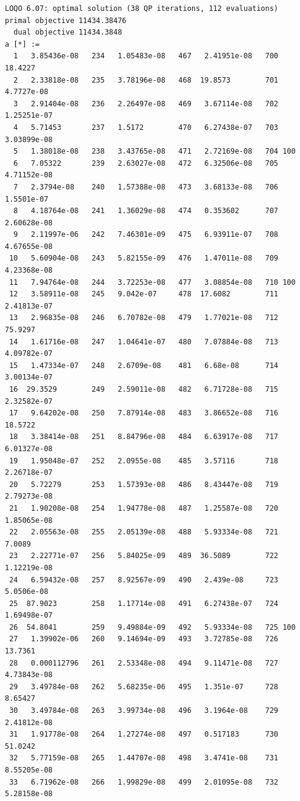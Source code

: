 \documentclass{article}
\begin{document}
\begin{verbatim}
LOQO 6.07: optimal solution (38 QP iterations, 112 evaluations)
primal objective 11434.38476
  dual objective 11434.3848
a [*] :=
  1   3.85436e-08   234   1.05483e-08   467   2.41951e-08   700  18.4227
  2   2.33818e-08   235   3.78196e-08   468  19.8573        701   4.7727e-08
  3   2.91404e-08   236   2.26497e-08   469   3.67114e-08   702   1.25251e-07
  4   5.71453       237   1.5172        470   6.27438e-07   703   3.03899e-08
  5   1.38018e-08   238   3.43765e-08   471   2.72169e-08   704 100
  6   7.05322       239   2.63027e-08   472   6.32506e-08   705   4.71152e-08
  7   2.3794e-08    240   1.57388e-08   473   3.68133e-08   706   1.5501e-07
  8   4.18764e-08   241   1.36029e-08   474   0.353602      707   2.60628e-08
  9   2.11997e-06   242   7.46301e-09   475   6.93911e-07   708   4.67655e-08
 10   5.60904e-08   243   5.82155e-09   476   1.47011e-08   709   4.23368e-08
 11   7.94764e-08   244   3.72253e-08   477   3.08854e-08   710 100
 12   3.58911e-08   245   9.042e-07     478  17.6082        711   2.41813e-07
 13   2.96835e-08   246   6.70782e-08   479   1.77021e-08   712  75.9297
 14   1.61716e-08   247   1.04641e-07   480   7.07884e-08   713   4.09782e-07
 15   1.47334e-07   248   2.6709e-08    481   6.68e-08      714   3.00134e-07
 16  29.3529        249   2.59011e-08   482   6.71728e-08   715   2.32582e-07
 17   9.64202e-08   250   7.87914e-08   483   3.86652e-08   716  18.5722
 18   3.38414e-08   251   8.84796e-08   484   6.63917e-08   717   6.01327e-08
 19   1.95048e-07   252   2.0955e-08    485   3.57116       718   2.26718e-07
 20   5.72279       253   1.57393e-08   486   8.43447e-08   719   2.79273e-08
 21   1.90208e-08   254   1.94778e-08   487   1.25587e-08   720   1.85065e-08
 22   2.05563e-08   255   2.05139e-08   488   5.93334e-08   721   7.0089
 23   2.22771e-07   256   5.84025e-09   489  36.5089        722   1.12219e-08
 24   6.59432e-08   257   8.92567e-09   490   2.439e-08     723   5.0506e-08
 25  87.9023        258   1.17714e-08   491   6.27438e-07   724   1.69498e-07
 26  54.8041        259   9.49884e-09   492   5.93334e-08   725 100
 27   1.39902e-06   260   9.14694e-09   493   3.72785e-08   726  13.7361
 28   0.000112796   261   2.53348e-08   494   9.11471e-08   727   4.73843e-08
 29   3.49784e-08   262   5.68235e-06   495   1.351e-07     728   8.65427
 30   3.49784e-08   263   3.99734e-08   496   3.1964e-08    729   2.41812e-08
 31   1.91778e-08   264   1.27274e-08   497   0.517183      730  51.0242
 32   5.77159e-08   265   1.44707e-08   498   3.4741e-08    731   8.55205e-08
 33   6.71962e-08   266   1.99829e-08   499   2.01095e-08   732   5.28158e-08

\end{verbatim}
\end{document}
